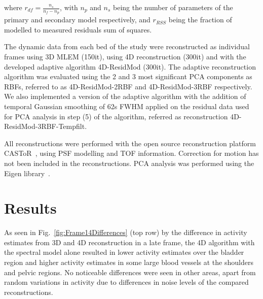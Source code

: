 where $r_{df} = \frac{n_s}{n_f - n_p}$, with $n_p$ and $n_s$ being the number of parameters of the primary and secondary model respectively, and $r_{RSS}$ being the fraction of modelled to measured residuals sum of squares. 

The dynamic data from each bed of the study were reconstructed as individual frames using 3D MLEM (150it), using 4D reconstruction (300it) and with the developed adaptive algorithm 4D-ResidMod (300it). The adaptive reconstruction algorithm was evaluated using the 2 and 3 most significant PCA components as RBFs, referred to as 4D-ResidMod-2RBF and 4D-ResidMod-3RBF respectively. We also implemented a version of the adaptive algorithm with the addition of temporal Gaussian smoothing of 62s FWHM applied on the residual data used for PCA analysis in step (5) of the algorithm, referred as reconstruction 4D-ResidMod-3RBF-Tempfilt.

All reconstructions were performed with the open source reconstruction platform CASToR~\cite{Merlin2018}, using PSF modelling and TOF information. Correction for motion has not been included in the reconstructions. PCA analysis was performed using the Eigen library~\cite{eigenweb}. 

\section{Results}
As seen in Fig.~\ref{fig:Frame14Differences} (top row) by the difference in activity estimates from 3D and 4D reconstruction in a late frame, the 4D algorithm with the spectral model alone resulted in lower activity estimates over the bladder region and higher activity estimates in some large blood vessels at the shoulders and pelvic regions. No noticeable differences were seen in other areas, apart from random variations in activity due to differences in noise levels of the compared reconstructions.

